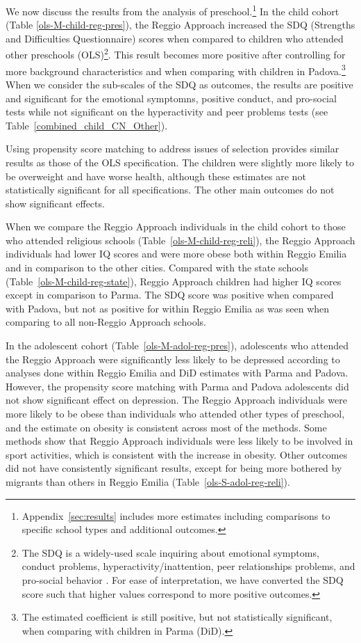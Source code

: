 We now discuss the results from the analysis of preschool.\footnote{Appendix~\ref{sec:results} includes more estimates including comparisons to specific school types and additional outcomes.} In the child cohort (Table \ref{ols-M-child-reg-pres}), the Reggio Approach increased the SDQ (Strengths and Difficulties Questionnaire) scores when compared to children who attended other preschools (OLS)\footnote{The SDQ is a widely-used scale inquiring about emotional symptoms, conduct problems, hyperactivity/inattention, peer relationships problems, and pro-social behavior \citep{Goodman_1997_JCPP}. For ease of interpretation, we have converted the SDQ score such that higher values correspond to more positive outcomes.}. This result becomes more positive after controlling for more background characteristics and when comparing with children in Padova.\footnote{The estimated coefficient is still positive, but not statistically significant, when comparing with children in Parma (DiD).} When we consider the sub-scales of the SDQ as outcomes, the results are positive and significant for the emotional symptomns, positive conduct, and pro-social tests while not significant on the hyperactivity and peer problems tests (see Table~\ref{combined_child_CN_Other}). 

Using propensity score matching to address issues of selection provides similar results as those of the OLS specification. The children were slightly more likely to be overweight and have worse health, although these estimates are not statistically significant for all specifications. The other main outcomes do not show significant effects. 

When we compare the Reggio Approach individuals in the child cohort to those who attended religious schools (Table~\ref{ols-M-child-reg-reli}), the Reggio Approach individuals had lower IQ scores and were more obese both within Reggio Emilia and in comparison to the other cities. Compared with the state schools (Table~\ref{ols-M-child-reg-state}), Reggio Approach children had higher IQ scores except in comparison to Parma. The SDQ score was positive when compared with Padova, but not as positive for within Reggio Emilia as was seen when comparing to all non-Reggio Approach schools.

In the adolescent cohort (Table~\ref{ols-M-adol-reg-pres}), adolescents who attended the Reggio Approach were significantly less likely to be depressed according to analyses done within Reggio Emilia and DiD estimates with Parma and Padova. However, the propensity score matching with Parma and Padova adolescents did not show significant effect on depression. The Reggio Approach individuals were more likely to be obese than individuals who attended other types of preschool, and the estimate on obesity is consistent across most of the methods. Some methods show that Reggio Approach individuals were less likely to be involved in sport activities, which is consistent with the increase in obesity. Other outcomes did not have consistently significant results, except for being more bothered by migrants than others in Reggio Emilia (Table~\ref{ols-S-adol-reg-reli}). 

